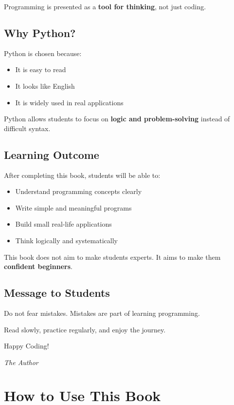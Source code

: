 Programming is presented as a \textbf{tool for thinking}, not just coding.

\section*{Why Python?}

Python is chosen because:
\begin{itemize}
    \item It is easy to read
    \item It looks like English
    \item It is widely used in real applications
\end{itemize}

Python allows students to focus on \textbf{logic and problem-solving} instead of difficult syntax.

\section*{Learning Outcome}

After completing this book, students will be able to:
\begin{itemize}
    \item Understand programming concepts clearly
    \item Write simple and meaningful programs
    \item Build small real-life applications
    \item Think logically and systematically
\end{itemize}

This book does not aim to make students experts.
It aims to make them \textbf{confident beginners}.

\section*{Message to Students}

Do not fear mistakes.
Mistakes are part of learning programming.

Read slowly, practice regularly, and enjoy the journey.

Happy Coding!

\vfill
\begin{flushright}
\textit{The Author}
\end{flushright}

\chapter*{How to Use This Book}

